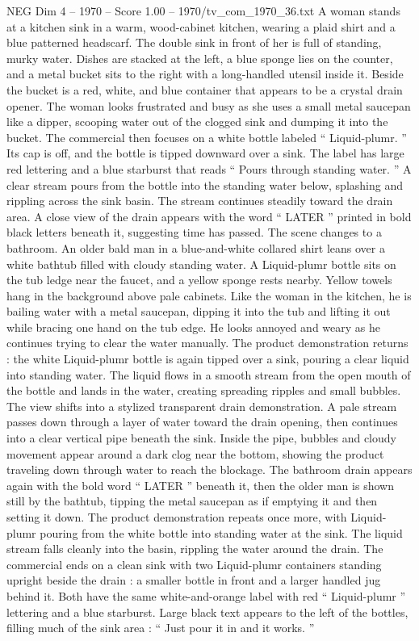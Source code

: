 \begin{textsample}{NEG Dim 4 – 1970 – Score 1.00 – 1970/tv\_com\_1970\_36.txt}  \label{ex:f4_neg_009}
A woman stands at a kitchen sink in a warm, wood-cabinet kitchen, wearing a plaid shirt and a blue patterned headscarf.
The double sink in front of her is full of standing, murky water.
Dishes are stacked at the left, a blue sponge lies on the counter, and a metal bucket sits to the right with a long-handled utensil inside it.
Beside the bucket is a red, white, and blue container that appears to be a crystal drain opener.
The woman looks frustrated and busy as she uses a small metal saucepan like a dipper, scooping water out of the clogged sink and dumping it into the bucket.
The commercial then focuses on a white bottle labeled “ Liquid-plumr. ” Its cap is off, and the bottle is tipped downward over a sink.
The label has large red lettering and a blue starburst that reads “ Pours through standing water. ” A clear stream pours from the bottle into the standing water below, splashing and rippling across the sink basin.
The stream continues steadily toward the drain area.
A close view of the drain appears with the word “ LATER ” printed in bold black letters beneath it, suggesting time has passed.
The scene changes to a bathroom.
An older bald man in a blue-and-white collared shirt leans over a white bathtub filled with cloudy standing water.
A Liquid-plumr bottle sits on the tub ledge near the faucet, and a yellow sponge rests nearby.
Yellow towels hang in the background above pale cabinets.
Like the woman in the kitchen, he is bailing water with a metal saucepan, dipping it into the tub and lifting it out while bracing one hand on the tub edge.
He looks annoyed and weary as he continues trying to clear the water manually.
The product demonstration returns : the white Liquid-plumr bottle is again tipped over a sink, pouring a clear liquid into standing water.
The liquid flows in a smooth stream from the open mouth of the bottle and lands in the water, creating spreading ripples and small bubbles.
The view shifts into a stylized transparent drain demonstration.
A pale stream passes down through a layer of water toward the drain opening, then continues into a clear vertical pipe beneath the sink.
Inside the pipe, bubbles and cloudy movement appear around a dark clog near the bottom, showing the product traveling down through water to reach the blockage.
The bathroom drain appears again with the bold word “ LATER ” beneath it, then the older man is shown still by the bathtub, tipping the metal saucepan as if emptying it and then setting it down.
The product demonstration repeats once more, with Liquid-plumr pouring from the white bottle into standing water at the sink.
The liquid stream falls cleanly into the basin, rippling the water around the drain.
The commercial ends on a clean sink with two Liquid-plumr containers standing upright beside the drain : a smaller bottle in front and a larger handled jug behind it.
Both have the same white-and-orange label with red “ Liquid-plumr ” lettering and a blue starburst.
Large black text appears to the left of the bottles, filling much of the sink area : “ Just pour it in and it works. ”

\end{textsample}

